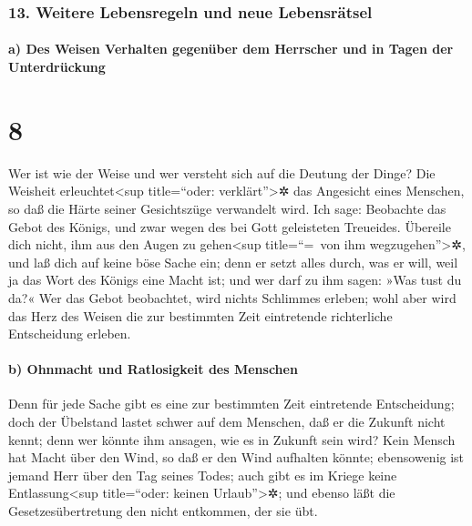 \hypertarget{weitere-lebensregeln-und-neue-lebensruxe4tsel}{%
\subsubsection{13. Weitere Lebensregeln und neue
Lebensrätsel}\label{weitere-lebensregeln-und-neue-lebensruxe4tsel}}

\hypertarget{a-des-weisen-verhalten-gegenuxfcber-dem-herrscher-und-in-tagen-der-unterdruxfcckung}{%
\paragraph{a) Des Weisen Verhalten gegenüber dem Herrscher und in Tagen
der
Unterdrückung}\label{a-des-weisen-verhalten-gegenuxfcber-dem-herrscher-und-in-tagen-der-unterdruxfcckung}}

\hypertarget{section-7}{%
\section{8}\label{section-7}}

Wer ist wie der Weise und wer versteht sich auf die
Deutung der Dinge? Die Weisheit erleuchtet\textless sup title=``oder:
verklärt''\textgreater✲ das Angesicht eines Menschen, so daß die Härte
seiner Gesichtszüge verwandelt wird. Ich sage: Beobachte
das Gebot des Königs, und zwar wegen des bei Gott geleisteten Treueides.
Übereile dich nicht, ihm aus den Augen zu
gehen\textless sup title=``=~von ihm wegzugehen''\textgreater✲, und laß
dich auf keine böse Sache ein; denn er setzt alles durch, was er will,
weil ja das Wort des Königs eine Macht ist; und wer darf
zu ihm sagen: »Was tust du da?« Wer das Gebot beobachtet,
wird nichts Schlimmes erleben; wohl aber wird das Herz des Weisen die
zur bestimmten Zeit eintretende richterliche Entscheidung erleben.

\hypertarget{b-ohnmacht-und-ratlosigkeit-des-menschen}{%
\paragraph{b) Ohnmacht und Ratlosigkeit des
Menschen}\label{b-ohnmacht-und-ratlosigkeit-des-menschen}}

Denn für jede Sache gibt es eine zur bestimmten Zeit
eintretende Entscheidung; doch der Übelstand lastet schwer auf dem
Menschen, daß er die Zukunft nicht kennt; denn wer könnte
ihm ansagen, wie es in Zukunft sein wird? Kein Mensch hat
Macht über den Wind, so daß er den Wind aufhalten könnte; ebensowenig
ist jemand Herr über den Tag seines Todes; auch gibt es im Kriege keine
Entlassung\textless sup title=``oder: keinen Urlaub''\textgreater✲; und
ebenso läßt die Gesetzesübertretung den nicht entkommen, der sie übt.

